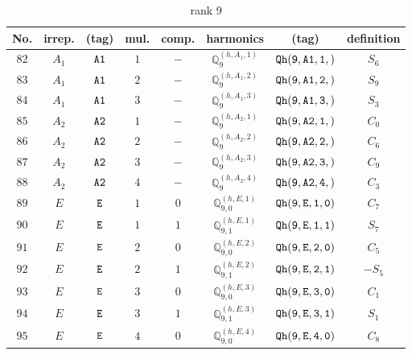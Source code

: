 \documentclass[fleqn,8pt]{jsarticle}
\begin{document}
\begin{table}[ht!]
\begin{center}
\caption{rank 9}
\renewcommand{\arraystretch}{1.3}
\begin{tabular}{cccccccc} \hline \hline
No. & irrep. & (tag) & mul. & comp. & harmonics & (tag) & definition \\ \hline
$ 82 $ & $ A_{1} $ & $ {\tt A1} $ & $ 1 $ & $ - $ & $ \mathbb{Q}_{9}^{(h,A_{1},1)} $ & $ {\tt Qh(9,A1,1,)} $ & $ S_{6} $ \\
$ 83 $ & $ A_{1} $ & $ {\tt A1} $ & $ 2 $ & $ - $ & $ \mathbb{Q}_{9}^{(h,A_{1},2)} $ & $ {\tt Qh(9,A1,2,)} $ & $ S_{9} $ \\
$ 84 $ & $ A_{1} $ & $ {\tt A1} $ & $ 3 $ & $ - $ & $ \mathbb{Q}_{9}^{(h,A_{1},3)} $ & $ {\tt Qh(9,A1,3,)} $ & $ S_{3} $ \\
$ 85 $ & $ A_{2} $ & $ {\tt A2} $ & $ 1 $ & $ - $ & $ \mathbb{Q}_{9}^{(h,A_{2},1)} $ & $ {\tt Qh(9,A2,1,)} $ & $ C_{0} $ \\
$ 86 $ & $ A_{2} $ & $ {\tt A2} $ & $ 2 $ & $ - $ & $ \mathbb{Q}_{9}^{(h,A_{2},2)} $ & $ {\tt Qh(9,A2,2,)} $ & $ C_{6} $ \\
$ 87 $ & $ A_{2} $ & $ {\tt A2} $ & $ 3 $ & $ - $ & $ \mathbb{Q}_{9}^{(h,A_{2},3)} $ & $ {\tt Qh(9,A2,3,)} $ & $ C_{9} $ \\
$ 88 $ & $ A_{2} $ & $ {\tt A2} $ & $ 4 $ & $ - $ & $ \mathbb{Q}_{9}^{(h,A_{2},4)} $ & $ {\tt Qh(9,A2,4,)} $ & $ C_{3} $ \\
$ 89 $ & $ E $ & $ {\tt E} $ & $ 1 $ & $ 0 $ & $ \mathbb{Q}_{9,0}^{(h,E,1)} $ & $ {\tt Qh(9,E,1,0)} $ & $ C_{7} $ \\
$ 90 $ & $ E $ & $ {\tt E} $ & $ 1 $ & $ 1 $ & $ \mathbb{Q}_{9,1}^{(h,E,1)} $ & $ {\tt Qh(9,E,1,1)} $ & $ S_{7} $ \\
$ 91 $ & $ E $ & $ {\tt E} $ & $ 2 $ & $ 0 $ & $ \mathbb{Q}_{9,0}^{(h,E,2)} $ & $ {\tt Qh(9,E,2,0)} $ & $ C_{5} $ \\
$ 92 $ & $ E $ & $ {\tt E} $ & $ 2 $ & $ 1 $ & $ \mathbb{Q}_{9,1}^{(h,E,2)} $ & $ {\tt Qh(9,E,2,1)} $ & $ - S_{5} $ \\
$ 93 $ & $ E $ & $ {\tt E} $ & $ 3 $ & $ 0 $ & $ \mathbb{Q}_{9,0}^{(h,E,3)} $ & $ {\tt Qh(9,E,3,0)} $ & $ C_{1} $ \\
$ 94 $ & $ E $ & $ {\tt E} $ & $ 3 $ & $ 1 $ & $ \mathbb{Q}_{9,1}^{(h,E,3)} $ & $ {\tt Qh(9,E,3,1)} $ & $ S_{1} $ \\
$ 95 $ & $ E $ & $ {\tt E} $ & $ 4 $ & $ 0 $ & $ \mathbb{Q}_{9,0}^{(h,E,4)} $ & $ {\tt Qh(9,E,4,0)} $ & $ C_{8} $ \\

\end{tabular}
\end{center}
\end{table}
\end{document}
